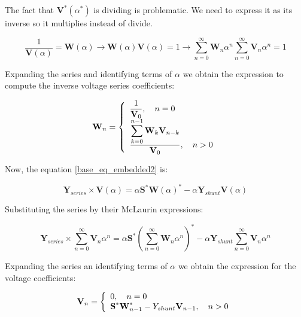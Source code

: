\documentclass[11pt,fleqn]{book} %
\begin{document}
The fact that $\textbf{V}^*( \alpha^* )$ is dividing is problematic. We need to express it as its inverse so it multiplies instead of divide.

\begin{equation} 
\frac{1}{\textbf{V}( \alpha)} = \textbf{W}( \alpha ) \longrightarrow \textbf{W}( \alpha ) \textbf{V}( \alpha) = 1 \longrightarrow \sum_{n=0}^{\infty}{\textbf{W}_n \alpha^n}  \sum_{n=0}^{\infty}{\textbf{V}_n \alpha^n} = 1
\end{equation}

Expanding the series and identifying terms of $\alpha$ we obtain the expression to compute the inverse voltage series coefficients:

\begin{equation}
\textbf{W}_n =
\left\{
	\begin{array}{ll}
		\mathlarger{\frac{1}{\textbf{V}_0}}, \quad n=0\\
		\mathlarger{\frac{\mathlarger{\sum_{k=0}^{n-1}\textbf{W}_k \textbf{V}_{n-k}}}{\textbf{V}_0}}, \quad n>0
	\end{array}
\right.
\end{equation}


Now, the equation \ref{base_eq_embedded2} is:

\begin{equation}
{\textbf{Y}_{series}\times \textbf{V}( \alpha )} = \alpha\textbf{S}^* \textbf{W}( \alpha)^*  - \alpha \textbf{Y}_{shunt} \textbf{V}( \alpha )
\label{base_eq_embedded3}
\end{equation}

Substituting the series by their McLaurin expressions:

\begin{equation}
{\textbf{Y}_{series}\times \sum_{n=0}^{\infty}{\textbf{V}_n \alpha^n}} = \alpha\textbf{S}^* \left(\sum_{n=0}^{\infty}{\textbf{W}_n \alpha^n}\right)^*  - \alpha \textbf{Y}_{shunt} \sum_{n=0}^{\infty}{\textbf{V}_n \alpha^n}
\label{base_eq_embedded4}
\end{equation}

Expanding the series an identifying terms of $\alpha$ we obtain the expression for the voltage coefficients:

\begin{equation}
\textbf{V}_n =
\left\{
	\begin{array}{ll}
		\mathlarger{0}, \quad n=0\\
		\mathlarger{\textbf{S}^* \textbf{W}^*_{n-1} - Y_{shunt} \textbf{V}_{n-1} }, \quad n>0
	\end{array}
\right.
\end{equation}
\end{document}
